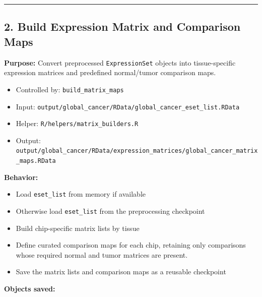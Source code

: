 \documentclass[
  letterpaper,
  DIV=11,
  numbers=noendperiod,
  openany,
  oneside]{scrreprt}
\providecommand{\tightlist}{%
  \setlength{\itemsep}{0pt}\setlength{\parskip}{0pt}}
\begin{document}
\begin{center}\rule{0.5\linewidth}{0.5pt}\end{center}

\subsection*{2. Build Expression Matrix and Comparison
Maps}\label{build-expression-matrix-and-comparison-maps}

\textbf{Purpose:} Convert preprocessed \texttt{ExpressionSet} objects
into tissue-specific expression matrices and predefined normal/tumor
comparison maps.

\begin{itemize}
\tightlist
\item
  Controlled by: \texttt{build\_matrix\_maps}
\item
  Input:
  \texttt{output/global\_cancer/RData/global\_cancer\_eset\_list.RData}
\item
  Helper: \texttt{R/helpers/matrix\_builders.R}
\item
  Output:
  \texttt{output/global\_cancer/RData/expression\_matrices/global\_cancer\_matrix\_maps.RData}
\end{itemize}

\textbf{Behavior:}

\begin{itemize}
\tightlist
\item
  Load \texttt{eset\_list} from memory if available
\item
  Otherwise load \texttt{eset\_list} from the preprocessing checkpoint
\item
  Build chip-specific matrix lists by tissue
\item
  Define curated comparison maps for each chip, retaining only
  comparisons whose required normal and tumor matrices are present.
\item
  Save the matrix lists and comparison maps as a reusable checkpoint
\end{itemize}

\textbf{Objects saved:}
\end{document}
